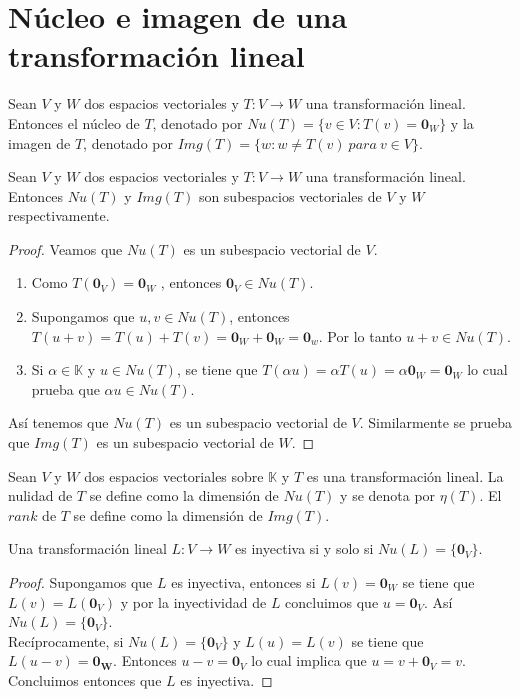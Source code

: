 \section{Núcleo e imagen de una transformación lineal}
\begin{dfn}
Sean $V$ y $W$ dos espacios vectoriales y $T : V \to W$ una transformación lineal. Entonces el núcleo de $T$, denotado por $Nu(T) = \{v \in V : T(v) = \mathbf{0}_W\}$ y la imagen de $T$, denotado por $Img(T) = \{w : w \neq T(v) \ para \ v \in V\}$.
\end{dfn}

\begin{theorem}
Sean $V$ y $W$ dos espacios vectoriales y $T : V \to W$ una transformación lineal. Entonces $Nu(T)$ y $Img(T)$ son subespacios vectoriales de $V$ y $W$ respectivamente.
\end{theorem}

\begin{proof}
Veamos que $Nu(T)$ es un subespacio vectorial de $V$.
\begin{enumerate}
\item Como $T(\mathbf{0}_V)=\mathbf{0}_W$ , entonces $\mathbf{0}_V \in Nu(T)$.
\item Supongamos que $u , v \in Nu(T)$, entonces $T(u+v) = T(u) + T(v) = \mathbf{0}_W + \mathbf{0}_W = \mathbf{0}_w$. Por lo tanto $u+v \in Nu(T)$.
\item Si $\alpha \in \mathbb{K}$ y $u \in Nu(T)$, se tiene que $T(\alpha u) = \alpha T(u) = \alpha \mathbf{0}_W = \mathbf{0}_W$ lo cual prueba que $\alpha u \in Nu(T)$.
\end{enumerate}
Así tenemos que $Nu(T)$ es un subespacio vectorial de $V$. Similarmente se prueba que $Img(T)$ es un subespacio vectorial de $W$.
\end{proof}

\begin{dfn}
Sean $V$ y $W$ dos espacios vectoriales sobre $\mathbb{K}$ y $T$ es una transformación lineal. La nulidad de $T$ se define como la dimensión de $Nu(T)$ y se denota por $\eta (T)$. El $rank$ de $T$ se define como la dimensión de $Img(T)$.
\end{dfn}

\begin{theorem}
Una transformación lineal $L : V \to W$ es inyectiva si y solo si $Nu(L) = \{\mathbf{0}_V\}$.
\end{theorem}

\begin{proof}
Supongamos que $L$ es inyectiva, entonces si $L(v) = \mathbf{0}_W$ se tiene que $L(v) = L(\mathbf{0}_V)$ y por la inyectividad de $L$ concluimos que $u = \mathbf{0}_V$. Así $Nu(L) = \{\mathbf{0}_V\}$.\\
Recíprocamente, si $Nu(L) = \{\mathbf{0}_V\}$ y $L(u) = L(v)$ se tiene que $L(u - v) = \mathbf{0_W}$. Entonces $u -v = \mathbf{0}_V$ lo cual implica que $u = v + \mathbf{0}_V = v$. Concluimos entonces que $L$ es inyectiva.
\end{proof}

